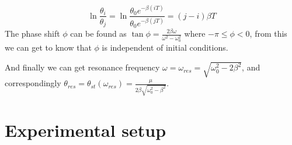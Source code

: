 \documentclass[12pt,a4paper]{article}
\begin{document}
\begin{equation}
    \ln{\frac{\theta_i}{\theta_j}}=\ln{\frac{\theta_0e^{-\beta(iT)}}{\theta_0e^{-\beta(jT)}}}=(j-i)\beta T
\end{equation}
The phase shift $\phi$ can be found as $\tan{\phi}=\frac{2\beta\omega}{\omega^2-\omega_0^2}$ where $-\pi \leq \phi <0$, from this we can get to know that $\phi$ is independent of initial conditions.\par
And finally we can get resonance frequency $\omega=\omega_{res}=\sqrt{\omega_0^2-2\beta^2}$, and correspondingly
$\theta_{res}=\theta_{st}(\omega_{res})=\frac{\mu}{2\beta\sqrt{\omega_0^2-\beta^2}}$.

\section{Experimental setup}

\end{document}
